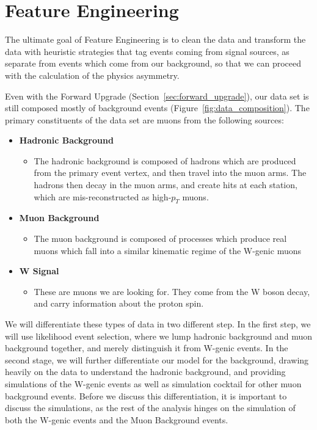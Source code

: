 \chapter{Feature Engineering}
\label{ch:feature_engineering}
The ultimate goal of Feature Engineering is to clean the data and transform the
data with heuristic strategies that tag events coming from signal sources, as
separate from events which come from our background, so that we can proceed with
the calculation of the physics asymmetry.

Even with the Forward Upgrade (Section~\ref{sec:forward_upgrade}), our data set
is still composed mostly of background events
(Figure~\ref{fig:data_composition}). The primary constituents of the data set
are muons from the following sources:

\begin{itemize}
  \item \textbf{Hadronic Background}
    \begin{itemize}
      \item The hadronic background is composed of hadrons which are produced
        from the primary event vertex, and then travel into the muon arms. The
        hadrons then decay in the muon arms, and create hits at each station,
        which are mis-reconstructed as high-$p_T$ muons.
    \end{itemize}
  \item \textbf{Muon Background}
    \begin{itemize}
        \item The muon background is composed of processes which produce real
          muons which fall into a similar kinematic regime of the W-genic muons
    \end{itemize}
  \item \textbf{W Signal}
    \begin{itemize}
        \item These are muons we are looking for. They come from the W boson
          decay, and carry information about the proton spin.
    \end{itemize}
\end{itemize}

We will differentiate these types of data in two different step. In the first
step, we will use likelihood event selection, where we lump hadronic background
and muon background together, and merely distinguish it from W-genic events. In
the second stage, we will further differentiate our model for the background,
drawing heavily on the data to understand the hadronic background, and providing
simulations of the W-genic events as well as simulation cocktail for other muon
background events. Before we discuss this differentiation, it is important to
discuss the simulations, as the rest of the analysis hinges on the simulation of
both the W-genic events and the Muon Background events.

